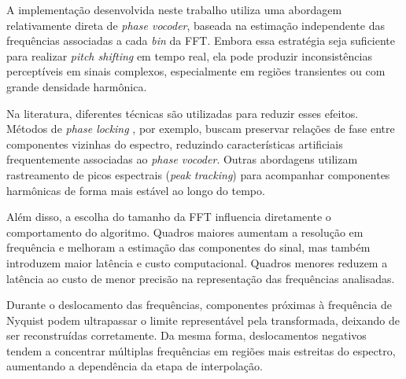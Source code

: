 A implementação desenvolvida neste trabalho utiliza uma abordagem relativamente direta de \textit{phase vocoder}, baseada na estimação independente das frequências associadas a cada \textit{bin} da FFT. Embora essa estratégia seja suficiente para realizar \textit{pitch shifting} em tempo real, ela pode produzir inconsistências perceptíveis em sinais complexos, especialmente em regiões transientes ou com grande densidade harmônica.

Na literatura, diferentes técnicas são utilizadas para reduzir esses efeitos. Métodos de \textit{phase locking} \cite{laroche1999}, por exemplo, buscam preservar relações de fase entre componentes vizinhas do espectro, reduzindo características artificiais frequentemente associadas ao \textit{phase vocoder}. Outras abordagens utilizam rastreamento de picos espectrais (\textit{peak tracking}) \cite{laroche1999} para acompanhar componentes harmônicas de forma mais estável ao longo do tempo.

Além disso, a escolha do tamanho da FFT influencia diretamente o comportamento do algoritmo. Quadros maiores aumentam a resolução em frequência e melhoram a estimação das componentes do sinal, mas também introduzem maior latência e custo computacional. Quadros menores reduzem a latência ao custo de menor precisão na representação das frequências analisadas.

Durante o deslocamento das frequências, componentes próximas à frequência de Nyquist podem ultrapassar o limite representável pela transformada, deixando de ser reconstruídas corretamente. Da mesma forma, deslocamentos negativos tendem a concentrar múltiplas frequências em regiões mais estreitas do espectro, aumentando a dependência da etapa de interpolação.
